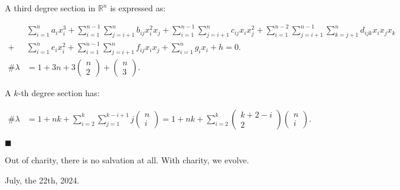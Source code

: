 \documentclass[12pt]{article}
\begin{document}
A third degree section in $\mathbb{R}^n$ is expressed as:

\begin{align}
&\sum_{i=1}^n a_i x_i^3 +\sum_{i=1}^{n-1} \sum_{j=i+1}^n b_{ij} x_i^2 x_j
+\sum_{i=1}^{n-1} \sum_{j=i+1}^n c_{ij} x_i x_j^2 +\sum_{i=1}^{n-2}\sum_{j=i+1}^{n-1} \sum_{k=j+1}^n d_{ijk} x_i x_j x_k \nonumber\\
+ &\sum_{i=1}^n e_i x_i^2 +\sum_{i=1}^{n-1} \sum_{j=i+1}^n f_{ij} x_i x_j+  \sum_{i=1}^n g_i x_i + h = 0. \\
\# \lambda &= 1 + 3n + 3\begin{pmatrix}
    n \\ 2
\end{pmatrix} + \begin{pmatrix}
    n \\ 3
\end{pmatrix}.
\end{align}

A $k$-th degree section has:

\begin{align}
    \# \lambda &= 1 + n k + \sum_{i=2}^{k} \sum_{j=1}^{k-i+1} j \begin{pmatrix}
        n \\ i
    \end{pmatrix} = 1 + n k + \sum_{i=2}^{k} \begin{pmatrix}
        k+2-i \\ 2
    \end{pmatrix}  \begin{pmatrix}
        n \\ i
    \end{pmatrix}.
   \end{align} 

\vspace{6mm}

$\blacksquare$

\vspace{12mm}

Out of charity, there is no salvation at all. With charity, we evolve.

July, the 22th, 2024.

%
\end{document}
